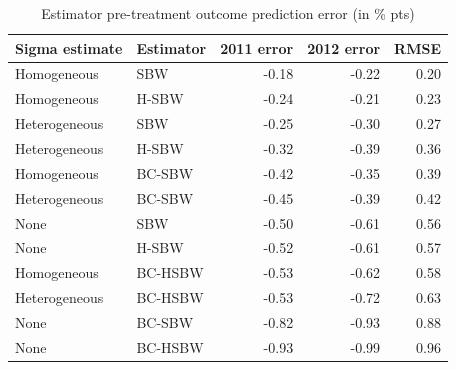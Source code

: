 \documentclass[aoas]{imsart}
\theoremstyle{plain}
\theoremstyle{remark}
\begin{document}
\begin{table}[ht]
\caption{Estimator
pre-treatment outcome prediction error (in \% pts)}\label{tab:pretxpred}
\begin{tabular}{llrrr}
  \hline
Sigma estimate & Estimator & 2011 error & 2012 error & RMSE \\ 
  \hline
Homogeneous & SBW & -0.18 & -0.22 & 0.20 \\ 
  Homogeneous & H-SBW & -0.24 & -0.21 & 0.23 \\ 
  Heterogeneous & SBW & -0.25 & -0.30 & 0.27 \\ 
  Heterogeneous & H-SBW & -0.32 & -0.39 & 0.36 \\ 
  Homogeneous & BC-SBW & -0.42 & -0.35 & 0.39 \\ 
  Heterogeneous & BC-SBW & -0.45 & -0.39 & 0.42 \\ 
  None & SBW & -0.50 & -0.61 & 0.56 \\ 
  None & H-SBW & -0.52 & -0.61 & 0.57 \\ 
  Homogeneous & BC-HSBW & -0.53 & -0.62 & 0.58 \\ 
  Heterogeneous & BC-HSBW & -0.53 & -0.72 & 0.63 \\ 
  None & BC-SBW & -0.82 & -0.93 & 0.88 \\ 
  None & BC-HSBW & -0.93 & -0.99 & 0.96 \\ 
   \hline
\end{tabular}
\end{table}
\end{document}
